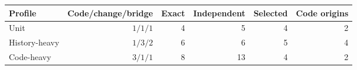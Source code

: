 \begin{tabular}{lrrrrr}
\toprule
Profile & Code/change/bridge & Exact & Independent & Selected & Code origins \\
\midrule
Unit & $1/1/1$ & 4 & 5 & 4 & 2 \\
History-heavy & $1/3/2$ & 6 & 6 & 5 & 4 \\
Code-heavy & $3/1/1$ & 8 & 13 & 4 & 2 \\
\bottomrule
\end{tabular}
